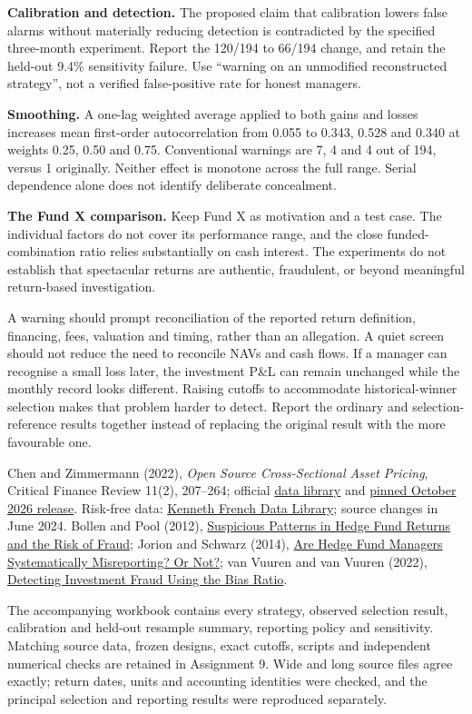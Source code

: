 \documentclass[11pt,letterpaper]{article}
\newcommand{\subhead}[1]{\vspace{5pt}{\large\bfseries #1}\par}
\newcommand{\note}[1]{{\small #1\par}}
\begin{document}
\textbf{Calibration and detection.} The proposed claim that calibration lowers false alarms without materially reducing detection is contradicted by the specified three-month experiment. Report the 120/194 to 66/194 change, and retain the held-out 9.4\% sensitivity failure. Use ``warning on an unmodified reconstructed strategy'', not a verified false-positive rate for honest managers.

\textbf{Smoothing.} A one-lag weighted average applied to both gains and losses increases mean first-order autocorrelation from 0.055 to 0.343, 0.528 and 0.340 at weights 0.25, 0.50 and 0.75. Conventional warnings are 7, 4 and 4 out of 194, versus 1 originally. Neither effect is monotone across the full range. Serial dependence alone does not identify deliberate concealment.

\textbf{The Fund X comparison.} Keep Fund X as motivation and a test case. The individual factors do not cover its performance range, and the close funded-combination ratio relies substantially on cash interest. The experiments do not establish that spectacular returns are authentic, fraudulent, or beyond meaningful return-based investigation.

\subhead{A practical implication an investor could use}
A warning should prompt reconciliation of the reported return definition, financing, fees, valuation and timing, rather than an allegation. A quiet screen should not reduce the need to reconcile NAVs and cash flows. If a manager can recognise a small loss later, the investment P\&L can remain unchanged while the monthly record looks different. Raising cutoffs to accommodate historical-winner selection makes that problem harder to detect. Report the ordinary and selection-reference results together instead of replacing the original result with the more favourable one.

\subhead{Sources and reproducibility}
\note{Chen and Zimmermann (2022), \emph{Open Source Cross-Sectional Asset Pricing}, Critical Finance Review 11(2), 207--264; official \href{https://www.openassetpricing.com/data/}{data library} and \href{https://huggingface.co/datasets/OpenSourceAP/CrossSection/tree/dd1054254c4501776432caa6d7ce5ecd9586f6a9}{pinned October 2026 release}. Risk-free data: \href{https://mba.tuck.dartmouth.edu/pages/faculty/ken.french/Data_Library/f-f_factors.html}{Kenneth French Data Library}; source changes in June 2024. Bollen and Pool (2012), \href{https://doi.org/10.1093/rfs/hhs085}{Suspicious Patterns in Hedge Fund Returns and the Risk of Fraud}; Jorion and Schwarz (2014), \href{https://doi.org/10.1016/j.jfineco.2013.10.001}{Are Hedge Fund Managers Systematically Misreporting? Or Not?}; van Vuuren and van Vuuren (2022), \href{https://doi.org/10.1177/21582440221097925}{Detecting Investment Fraud Using the Bias Ratio}.}

\note{The accompanying workbook contains every strategy, observed selection result, calibration and held-out resample summary, reporting policy and sensitivity. Matching source data, frozen designs, exact cutoffs, scripts and independent numerical checks are retained in Assignment 9. Wide and long source files agree exactly; return dates, units and accounting identities were checked, and the principal selection and reporting results were reproduced separately.}
\end{document}
